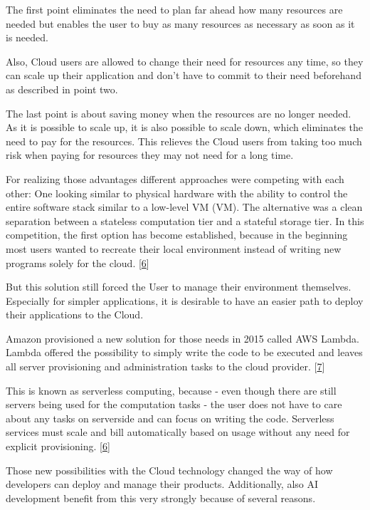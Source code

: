\documentclass[12pt,english,a4paper,oneside,,tablecaptionabove]{scrbook}
\begin{document}
The first point eliminates the need to plan far ahead how many resources
are needed but enables the user to buy as many resources as necessary as
soon as it is needed.

Also, Cloud users are allowed to change their need for resources any
time, so they can scale up their application and don't have to commit to
their need beforehand as described in point two.

The last point is about saving money when the resources are no longer
needed. As it is possible to scale up, it is also possible to scale
down, which eliminates the need to pay for the resources. This relieves
the Cloud users from taking too much risk when paying for resources they
may not need for a long time.

For realizing those advantages different approaches were competing with
each other: One looking similar to physical hardware with the ability to
control the entire software stack similar to a low-level \acl{VM}
(\acs{VM}). The alternative was a clean separation between a stateless
computation tier and a stateful storage tier. In this competition, the
first option has become established, because in the beginning most users
wanted to recreate their local environment instead of writing new
programs solely for the cloud.
{[}\protect\hyperlink{ref-Jonas2019}{6}{]}

But this solution still forced the User to manage their environment
themselves. Especially for simpler applications, it is desirable to have
an easier path to deploy their applications to the Cloud.

Amazon provisioned a new solution for those needs in 2015 called AWS
Lambda. Lambda offered the possibility to simply write the code to be
executed and leaves all server provisioning and administration tasks to
the cloud provider. {[}\protect\hyperlink{ref-Amazon}{7}{]}

This is known as serverless computing, because - even though there are
still servers being used for the computation tasks - the user does not
have to care about any tasks on serverside and can focus on writing the
code. Serverless services must scale and bill automatically based on
usage without any need for explicit provisioning.
{[}\protect\hyperlink{ref-Jonas2019}{6}{]}

Those new possibilities with the Cloud technology changed the way of how
developers can deploy and manage their products. Additionally, also AI
development benefit from this very strongly because of several reasons.
\end{document}
